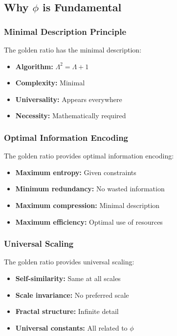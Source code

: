 \documentclass[11pt]{article}
\theoremstyle{definition}
\newcommand{\goldenratio}{\phi}
\begin{document}
\subsection{Why $\goldenratio$ is Fundamental}

\subsubsection{Minimal Description Principle}

The golden ratio has the minimal description:

\begin{itemize}
\item \textbf{Algorithm:} $\Lambda^2 = \Lambda + 1$
\item \textbf{Complexity:} Minimal
\item \textbf{Universality:} Appears everywhere
\item \textbf{Necessity:} Mathematically required
\end{itemize}

\subsubsection{Optimal Information Encoding}

The golden ratio provides optimal information encoding:

\begin{itemize}
\item \textbf{Maximum entropy:} Given constraints
\item \textbf{Minimum redundancy:} No wasted information
\item \textbf{Maximum compression:} Minimal description
\item \textbf{Maximum efficiency:} Optimal use of resources
\end{itemize}

\subsubsection{Universal Scaling}

The golden ratio provides universal scaling:

\begin{itemize}
\item \textbf{Self-similarity:} Same at all scales
\item \textbf{Scale invariance:} No preferred scale
\item \textbf{Fractal structure:} Infinite detail
\item \textbf{Universal constants:} All related to $\goldenratio$
\end{itemize}
\end{document}
